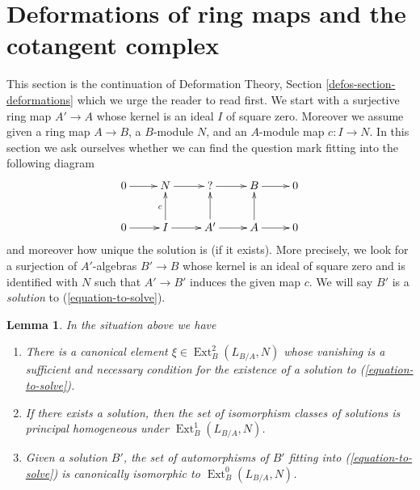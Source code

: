 \documentclass{stacks-project}
\theoremstyle{plain}
\newtheorem{lemma}[subsection]{Lemma}
\theoremstyle{definition}
\theoremstyle{remark}
\numberwithin{equation}{subsection}
\def\Ext{\mathop{\mathrm{Ext}}\nolimits}
\begin{document}
\section{Deformations of ring maps and the cotangent complex}
\label{section-deformations}

\noindent
This section is the continuation of
Deformation Theory, Section \ref{defos-section-deformations}
which we urge the reader to read first.
We start with a surjective ring map $A' \to A$
whose kernel is an ideal $I$ of square zero. Moreover we assume
given a ring map $A \to B$, a $B$-module $N$, and an $A$-module map
$c : I \to N$. In this section we ask ourselves whether we can find
the question mark fitting into the following diagram
\begin{equation}
\label{equation-to-solve}
\vcenter{
\xymatrix{
0 \ar[r] & N \ar[r] & {?} \ar[r] & B \ar[r] & 0 \\
0 \ar[r] & I \ar[u]^c \ar[r] & A' \ar[u] \ar[r] & A \ar[u] \ar[r] & 0
}
}
\end{equation}
and moreover how unique the solution is (if it exists). More precisely,
we look for a surjection of $A'$-algebras $B' \to B$ whose kernel is
an ideal of square zero and is
identified with $N$ such that $A' \to B'$ induces the given map $c$.
We will say $B'$ is a {\it solution} to (\ref{equation-to-solve}).

\begin{lemma}
\label{lemma-find-obstruction}
In the situation above we have
\begin{enumerate}
\item There is a canonical element $\xi \in \Ext^2_B(L_{B/A}, N)$
whose vanishing is a sufficient and necessary condition for the existence
of a solution to (\ref{equation-to-solve}).
\item If there exists a solution, then the set of
isomorphism classes of solutions is principal homogeneous under
$\Ext^1_B(L_{B/A}, N)$.
\item Given a solution $B'$, the set of automorphisms of $B'$
fitting into (\ref{equation-to-solve}) is canonically isomorphic
to $\Ext^0_B(L_{B/A}, N)$.
\end{enumerate}
\end{lemma}
\end{document}
